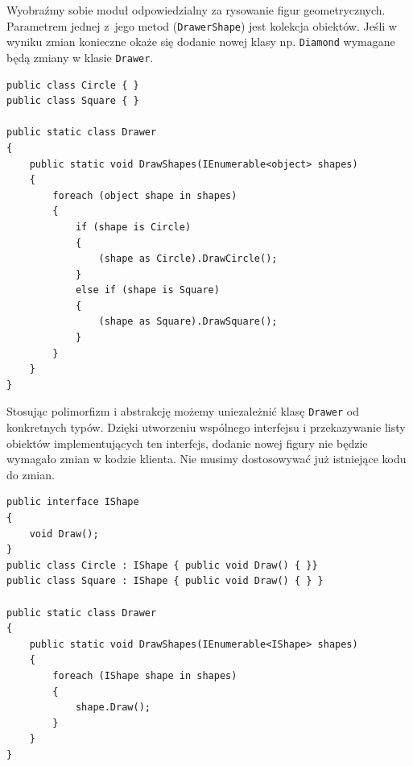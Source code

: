 Wyobraźmy sobie moduł odpowiedzialny za rysowanie figur geometrycznych. Parametrem jednej z~jego metod (\texttt{DrawerShape}) jest kolekcja obiektów. Jeśli w wyniku zmian konieczne okaże się dodanie nowej klasy np. \texttt{Diamond} wymagane będą zmiany w klasie \texttt{Drawer}.
\begin{lstlisting}[caption={Naruszenie zasady OCP}, label={lab1/lst/ocpViolationShapes}]
public class Circle { }
public class Square { }

public static class Drawer 
{
	public static void DrawShapes(IEnumerable<object> shapes) 
	{
		foreach (object shape in shapes) 
		{
			if (shape is Circle) 
			{
				(shape as Circle).DrawCircle();
			} 
			else if (shape is Square) 
			{
				(shape as Square).DrawSquare();
			}
		}
	}
}
\end{lstlisting}

Stosując polimorfizm i abstrakcję możemy uniezależnić klasę \texttt{Drawer} od konkretnych typów. Dzięki utworzeniu wspólnego interfejsu i przekazywanie listy obiektów implementujących ten interfejs, dodanie nowej figury nie będzie wymagało zmian w kodzie klienta. Nie musimy dostosowywać już istniejące kodu do zmian.

\begin{lstlisting}[caption={Poprawne zastosowanie zasady OCP}, label={lab1/lst/ocpShapesCorrect}]
public interface IShape 
{ 
	void Draw(); 
}
public class Circle : IShape { public void Draw() { }}
public class Square : IShape { public void Draw() { } }

public static class Drawer 
{
	public static void DrawShapes(IEnumerable<IShape> shapes) 
	{
		foreach (IShape shape in shapes) 
		{
			shape.Draw();
		}
	}
}
\end{lstlisting}



